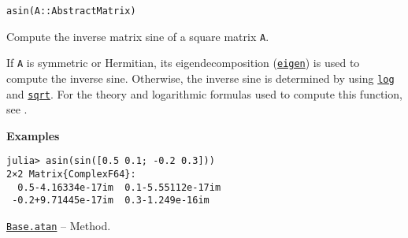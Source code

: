 \begin{adjustwidth}{2em}{0pt}


\begin{verbatim}
asin(A::AbstractMatrix)
\end{verbatim}

Compute the inverse matrix sine of a square matrix \texttt{A}.

If \texttt{A} is symmetric or Hermitian, its eigendecomposition (\hyperlink{11056016707394839114}{\texttt{eigen}}) is used to compute the inverse sine. Otherwise, the inverse sine is determined by using \hyperlink{17317607370922767936}{\texttt{log}} and \hyperlink{4551113327515323898}{\texttt{sqrt}}.  For the theory and logarithmic formulas used to compute this function, see \footnotemark[13].

\textbf{Examples}


\begin{verbatim}
julia> asin(sin([0.5 0.1; -0.2 0.3]))
2×2 Matrix{ComplexF64}:
  0.5-4.16334e-17im  0.1-5.55112e-17im
 -0.2+9.71445e-17im  0.3-1.249e-16im
\end{verbatim}



\end{adjustwidth}
\hypertarget{9251659059045147805}{}
\hyperlink{9251659059045147805}{\texttt{Base.atan}}  -- {Method.}

